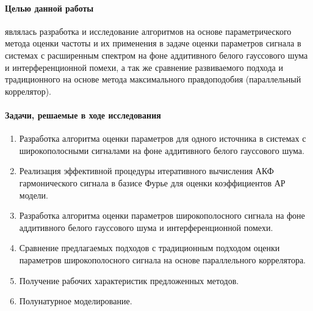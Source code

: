 %
%

\paragraph{Целью данной работы} являлась разработка и исследование алгоритмов на основе параметрического метода оценки частоты 
и их применения в задаче оценки параметров сигнала в системах с расширенным спектром на фоне аддитивного белого гауссового шума и интерференционной помехи,
а так же сравнение развиваемого подхода и традиционного на основе метода максимального правдоподобия (параллельный коррелятор).

\paragraph{Задачи, решаемые в ходе исследования}
\begin{enumerate}
	\item {Разработка алгоритма оценки параметров для одного источника в системах с широкополосными сигналами на фоне аддитивного
		белого гауссового шума.}
	\item {Реализация эффективной процедуры итеративного вычисления АКФ гармонического сигнала в базисе Фурье для оценки коэффициентов АР модели.}
	\item {Разработка алгоритма оценки параметров широкополосного сигнала на фоне аддитивного белого гауссового шума и
		интерференционной помехи.}
	\item {Сравнение предлагаемых подходов с традиционным подходом оценки параметров широкополосного сигнала на основе параллельного коррелятора.}
	\item {Получение рабочих характеристик предложенных методов.}
	\item {Полунатурное моделирование.}
\end{enumerate}

